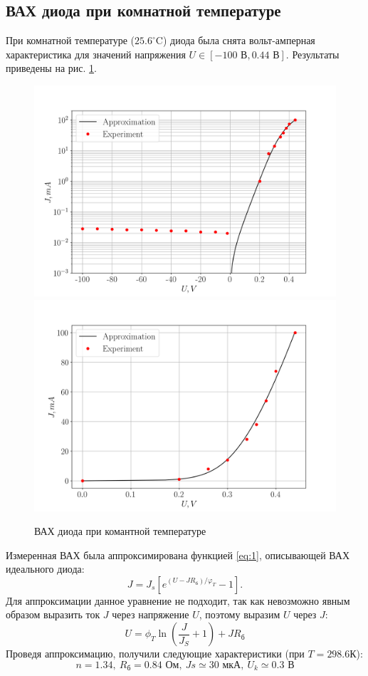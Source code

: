 \subsection{ВАХ диода при комнатной температуре}
При комнатной температуре ($25.6^{\circ}$C) диода была снята вольт-амперная характеристика для значений напряжения $U \in
[-100\text{ В},0.44\text{ В}]$. Результаты приведены на рис. \ref{fig:vah}.
\begin{figure}[h!]
    \centering
	\includegraphics[width = 0.49\linewidth]{imgs/vah1log.png}
    \includegraphics[width = 0.49\linewidth]{imgs/vah1str.png}	
    \caption{ВАХ диода при комантной температуре}
    \label{fig:vah}
\end{figure}
Измеренная ВАХ была аппроксимирована функцией \eqref{eq:1}, описывающей ВАХ идеального диода:
\begin{equation}
    J=J_s[e^{(U-JR_{\text{б}})/\varphi_T}-1].
    \label{eq:id}
\end{equation}
Для аппроксимации данное уравнение не подходит, так как невозможно явным образом выразить ток $J$ через напряжение
$U$, поэтому выразим $U$ через $J$: 
\begin{equation}
    U = \phi_T \ln{(\frac{J}{J_S}+1 )}+J R_{\text{б}}
    \label{eq:id2}
\end{equation}
Проведя аппроксимацию, получили следующие характеристики (при $T=298.6$К):
\begin{equation}
    n = 1.34,~ R_{\text{б}} = 0.84 \text{ Ом},~Js \simeq 30 \text{ мкА},~ U_k \simeq 0.3 \text{ В}
\end{equation}

